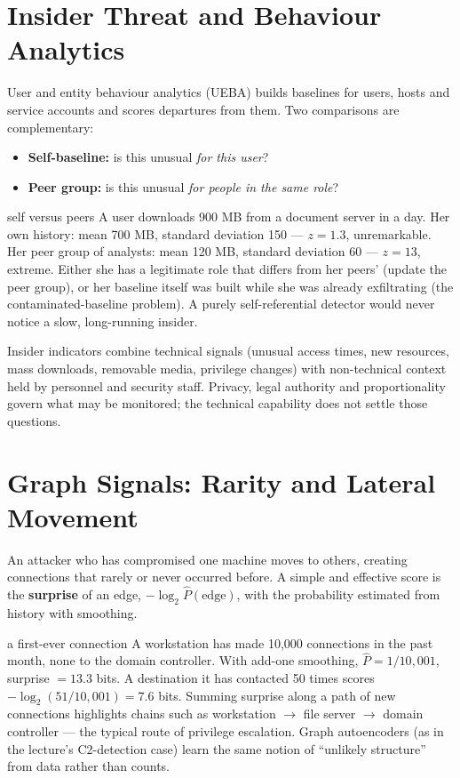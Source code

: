 \documentclass[11pt]{article}
\begin{document}
\section{Insider Threat and Behaviour Analytics}
User and entity behaviour analytics (UEBA) builds baselines for users, hosts and service accounts and scores departures from them. Two comparisons are complementary:
\begin{itemize}
\item \textbf{Self-baseline:} is this unusual \emph{for this user}?
\item \textbf{Peer group:} is this unusual \emph{for people in the same role}?
\end{itemize}
\begin{example}{self versus peers}
A user downloads 900 MB from a document server in a day. Her own history: mean 700 MB, standard deviation 150 --- $z=1.3$, unremarkable. Her peer group of analysts: mean 120 MB, standard deviation 60 --- $z=13$, extreme. Either she has a legitimate role that differs from her peers' (update the peer group), or her baseline itself was built while she was already exfiltrating (the contaminated-baseline problem). A purely self-referential detector would never notice a slow, long-running insider.
\end{example}
Insider indicators combine technical signals (unusual access times, new resources, mass downloads, removable media, privilege changes) with non-technical context held by personnel and security staff. Privacy, legal authority and proportionality govern what may be monitored; the technical capability does not settle those questions.

\section{Graph Signals: Rarity and Lateral Movement}
An attacker who has compromised one machine moves to others, creating connections that rarely or never occurred before. A simple and effective score is the \textbf{surprise} of an edge, $-\log_2\hat P(\text{edge})$, with the probability estimated from history with smoothing.
\begin{example}{a first-ever connection}
A workstation has made 10,000 connections in the past month, none to the domain controller. With add-one smoothing, $\hat P=1/10{,}001$, surprise $=13.3$ bits. A destination it has contacted 50 times scores $-\log_2(51/10{,}001)=7.6$ bits. Summing surprise along a path of new connections highlights chains such as workstation $\to$ file server $\to$ domain controller --- the typical route of privilege escalation. Graph autoencoders (as in the lecture's C2-detection case) learn the same notion of ``unlikely structure'' from data rather than counts.
\end{example}
\end{document}

